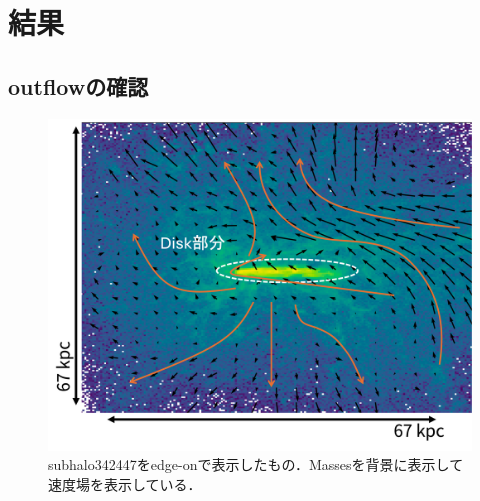 \documentclass[main.tex]{subfiles}
\begin{document}
	\chapter{結果}
	
	\section{outflowの確認}
	
	\begin{figure}[htbp]
		\centering
		\includegraphics[width=0.6\linewidth]{pic/outflow_subhalo342447}
		\captionsetup{width=.8\linewidth}
		\caption{subhalo342447をedge-onで表示したもの．Massesを背景に表示して速度場を表示している．}
		\label{fig:outflowsubhalo342447}
	\end{figure}
	
\end{document}
